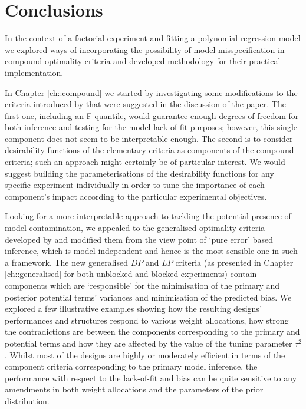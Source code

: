 \section{Conclusions}

In the context of a factorial experiment and fitting a polynomial regression model we explored ways of incorporating the possibility of model misspecification in compound optimality criteria and developed methodology for their practical implementation.

In Chapter \ref{ch::compound} we started by investigating some modifications to the criteria introduced by \cite{GilmourTrinca2012} that were suggested in the discussion of the paper. The first one, including an F-quantile, would guarantee enough degrees of freedom for both inference and testing for the model lack of fit purposes; however, this single component does not seem to be interpretable enough. The second is to consider desirability functions of the elementary criteria as components of the compound criteria; such an approach might certainly be of particular interest. We would suggest building the parameterisations of the desirability functions for any specific experiment individually in order to tune the importance of each component's impact according to the particular experimental objectives.

Looking for a more interpretable approach to tackling the potential presence of model contamination, we appealed to the generalised optimality criteria developed by \cite{Goos2005model} and modified them from the view point of `pure error' based inference, which is model-independent and hence is the most sensible one in such a framework. The new generalised $DP$ and $LP$ criteria (as presented in Chapter \ref{ch::generalised} for both unblocked and blocked experiments) contain components which are `responsible' for the minimisation of the primary and posterior potential terms' variances and minimisation of the predicted bias. We explored a few illustrative examples showing how the resulting designs' performances and structures respond to various weight allocations, how strong the contradictions are between the components corresponding to the primary and potential terms and how they are affected by the value of the tuning parameter $\tau^2$. Whilst most of the designs are highly or moderately efficient in terms of the component criteria corresponding to the primary model inference, the performance with respect to the lack-of-fit and bias can be quite sensitive to any amendments in both weight allocations and the parameters of the prior distribution. 

